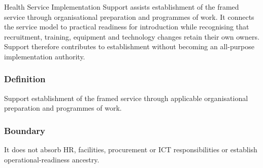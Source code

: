 Health Service Implementation Support assists establishment of the framed service through organisational preparation and programmes of work. It connects the service model to practical readiness for introduction while recognising that recruitment, training, equipment and technology changes retain their own owners. Support therefore contributes to establishment without becoming an all-purpose implementation authority.

\subsubsection*{Definition}

Support establishment of the framed service through applicable organisational preparation and programmes of work.

\subsubsection*{Boundary}

It does not absorb HR, facilities, procurement or ICT responsibilities or establish operational-readiness ancestry.

